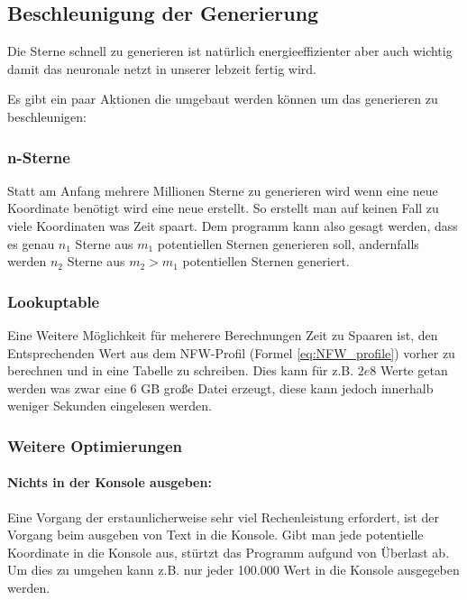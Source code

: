 \subsection{Beschleunigung der Generierung}

Die Sterne schnell zu generieren ist natürlich energieeffizienter aber auch
wichtig damit das neuronale netzt in unserer lebzeit fertig wird.

Es gibt ein paar Aktionen die umgebaut werden können um das generieren zu
beschleunigen:

\subsubsection{n-Sterne}

Statt am Anfang mehrere Millionen Sterne zu generieren wird wenn eine
neue Koordinate benötigt wird eine neue erstellt. So erstellt man auf keinen
Fall zu viele Koordinaten was Zeit spaart.
Dem programm kann also gesagt werden, dass es genau \( n_1 \) Sterne aus
\( m_1 \) potentiellen Sternen generieren soll, andernfalls werden \( n_2 \)
Sterne aus \( m_2 > m_1 \) potentiellen Sternen generiert.

\subsubsection{Lookuptable} \label{subsec:lookuptable}

Eine Weitere Möglichkeit für meherere Berechnungen Zeit zu Spaaren ist, den
Entsprechenden Wert aus dem NFW-Profil (Formel \ref{eq:NFW_profile}) vorher zu
berechnen und in eine Tabelle zu schreiben.
Dies kann für z.B. \( 2e8 \) Werte getan werden was zwar eine 6 GB große Datei
erzeugt, diese kann jedoch innerhalb weniger Sekunden eingelesen werden.

\subsubsection{Weitere Optimierungen}

\paragraph{Nichts in der Konsole ausgeben:}

Eine Vorgang der erstaunlicherweise sehr viel Rechenleistung erfordert, ist
der Vorgang beim ausgeben von Text in die Konsole. Gibt man jede potentielle
Koordinate in die Konsole aus, stürtzt das Programm aufgund von Überlast ab.
Um dies zu umgehen kann z.B. nur jeder 100.000 Wert in die Konsole ausgegeben
werden.

